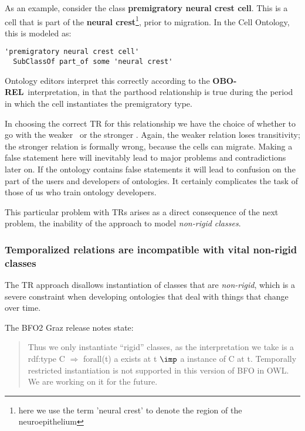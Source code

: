 \documentclass{bioinfo}
\def\atAllTimes{\pr{at-all-times}}
\def\atSomeTimes{\pr{at-some-times}}
\def\OBOREL{\textbf{OBO-REL}}
\begin{document}
As an example, consider the class \textbf{premigratory neural crest
  cell}. This is a cell that is part of the \textbf{neural
  crest}\footnote{here we use the term 'neural crest' to denote the
  region of the neuroepithelium}, prior to migration. In the Cell
Ontology, this is modeled as:

\begin{verbatim}
'premigratory neural crest cell' 
  SubClassOf part_of some 'neural crest'
\end{verbatim}

Ontology editors interpret this correctly according to the \OBOREL\
interpretation, in that the parthood relationship is true during the
period in which the cell instantiates the premigratory type.

In choosing the correct TR for this relationship we have the choice of
whether to go with the weaker \atSomeTimes\ or the stronger
\atAllTimes. Again, the weaker relation loses transitivity; the
stronger relation is formally wrong, because the cells can
migrate. Making a false statement here will inevitably lead to major
problems and contradictions later on. If the ontology contains false
statements it will lead to confusion on the part of the users and
developers of ontologies. It certainly complicates the task of those
of us who train ontology developers.

This particular problem with TRs arises as a direct consequence of the
next problem, the inability of the approach to model \emph{non-rigid
  classes}.

\subsubsection{Temporalized relations are incompatible with vital
  non-rigid classes}

The TR approach disallows instantiation of classes that are
\emph{non-rigid}, which is a severe constraint when developing
ontologies that deal with things that change over time.

The BFO2 Graz release notes\cite{Graz} state:

\begin{quotation}

  Thus we only instantiate ``rigid'' classes, as the interpretation we
  take is a rdf:type C $\Rightarrow$ forall(t) a exists at t $\imp$ a
  instance of C at t. Temporally restricted instantiation is not
  supported in this version of BFO in OWL. We are working on it for
  the future.

\end{quotation}
\end{document}
